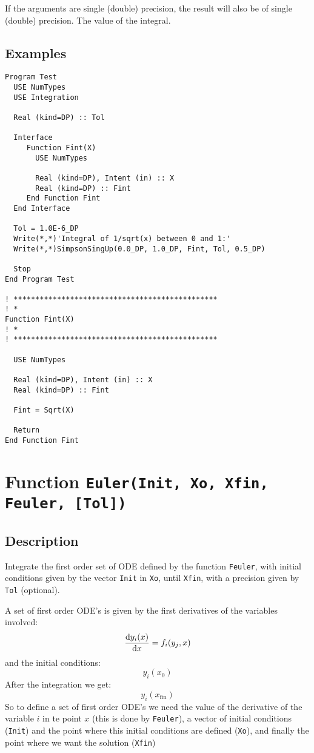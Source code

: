 If the arguments are single (double) precision, the result will also be of
single (double) precision. The value of the integral.


\subsection{Examples}

\begin{verbatim}
Program Test
  USE NumTypes
  USE Integration

  Real (kind=DP) :: Tol

  Interface 
     Function Fint(X)
       USE NumTypes

       Real (kind=DP), Intent (in) :: X
       Real (kind=DP) :: Fint
     End Function Fint
  End Interface

  Tol = 1.0E-6_DP
  Write(*,*)'Integral of 1/sqrt(x) between 0 and 1:'
  Write(*,*)SimpsonSingUp(0.0_DP, 1.0_DP, Fint, Tol, 0.5_DP)

  Stop
End Program Test

! ***********************************************
! *
Function Fint(X)
! *  
! ***********************************************

  USE NumTypes

  Real (kind=DP), Intent (in) :: X
  Real (kind=DP) :: Fint

  Fint = Sqrt(X)

  Return
End Function Fint
\end{verbatim}

\section{Function \texttt{Euler(Init, Xo, Xfin, Feuler, [Tol])}}

\subsection{Description}

Integrate the first order set of ODE defined by the function
\texttt{Feuler}, with initial conditions given by the vector
\texttt{Init} in \texttt{Xo}, until \texttt{Xfin}, with a precision
given by \texttt{Tol} (optional).

A set of first order ODE's is given by the first derivatives of the
variables involved:
\begin{displaymath}
  \frac{\mathrm{d} y_i(x)}{\mathrm{d} x} = f_i(y_j, x)
\end{displaymath}
and the initial conditions:
\begin{displaymath}
  y_i(x_0)
\end{displaymath}
After the integration we get:
\begin{displaymath}
  y_i(x_{\text{fin}})
\end{displaymath}
So to define a set of first order ODE's we need the value of the
derivative of the variable $i$ in te point $x$ (this is done by
\texttt{Feuler}), a vector of initial conditions (\texttt{Init}) and
the point where this initial conditions are defined (\texttt{Xo}), and
finally the point where we want the solution (\texttt{Xfin})

